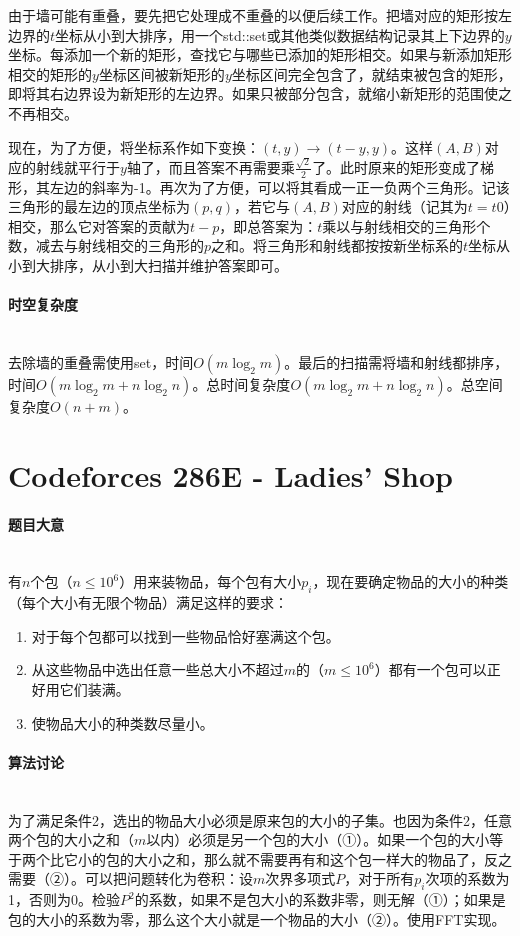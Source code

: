 \documentclass[UTF8]{ctexart}
\newcommand{\myparagraph}[1]{\paragraph{#1}\mbox{}\\}
\theoremstyle{nonumberplain}
\begin{document}
			由于墙可能有重叠，要先把它处理成不重叠的以便后续工作。把墙对应的矩形按左边界的$t$坐标从小到大排序，用一个std::set或其他类似数据结构记录其上下边界的$y$坐标。每添加一个新的矩形，查找它与哪些已添加的矩形相交。如果与新添加矩形相交的矩形的$y$坐标区间被新矩形的$y$坐标区间完全包含了，就结束被包含的矩形，即将其右边界设为新矩形的左边界。如果只被部分包含，就缩小新矩形的范围使之不再相交。
			
			现在，为了方便，将坐标系作如下变换：$(t,y) \to (t-y,y)$。这样$(A,B)$对应的射线就平行于$y$轴了，而且答案不再需要乘$\frac{\sqrt{2}}{2}$了。此时原来的矩形变成了梯形，其左边的斜率为-1。再次为了方便，可以将其看成一正一负两个三角形。记该三角形的最左边的顶点坐标为$(p,q)$，若它与$(A,B)$对应的射线（记其为$t=t0$）相交，那么它对答案的贡献为$t-p$，即总答案为：$t$乘以与射线相交的三角形个数，减去与射线相交的三角形的$p$之和。将三角形和射线都按按新坐标系的$t$坐标从小到大排序，从小到大扫描并维护答案即可。
		
		\myparagraph{时空复杂度}
		
			去除墙的重叠需使用set，时间$O(m\log_2m)$。最后的扫描需将墙和射线都排序，时间$O(m\log_2m + n\log_2n)$。总时间复杂度$O(m\log_2m + n\log_2n)$。总空间复杂度$O(n+m)$。
	
	\section{Codeforces 286E - Ladies' Shop}
	
		\myparagraph{题目大意}
		
			有$n$个包（$n \leq 10^6$）用来装物品，每个包有大小$p_i$，现在要确定物品的大小的种类（每个大小有无限个物品）满足这样的要求：
			
			\begin{enumerate}
				\item 对于每个包都可以找到一些物品恰好塞满这个包。
				\item 从这些物品中选出任意一些总大小不超过$m$的（$m \leq 10^6$）都有一个包可以正好用它们装满。
				\item 使物品大小的种类数尽量小。
			\end{enumerate}
		
		\myparagraph{算法讨论}
		
			为了满足条件2，选出的物品大小必须是原来包的大小的子集。也因为条件2，任意两个包的大小之和（$m$以内）必须是另一个包的大小（①）。如果一个包的大小等于两个比它小的包的大小之和，那么就不需要再有和这个包一样大的物品了，反之需要（②）。可以把问题转化为卷积：设$m$次界多项式$P$，对于所有$p_i$次项的系数为1，否则为0。检验$P^2$的系数，如果不是包大小的系数非零，则无解（①）；如果是包的大小的系数为零，那么这个大小就是一个物品的大小（②）。使用FFT实现。
		
\end{document}
